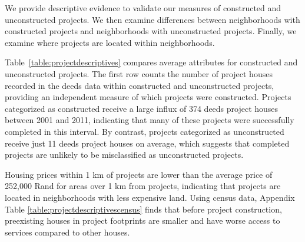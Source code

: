 \documentclass[12pt]{article}
\begin{document}






We provide descriptive evidence to validate our measures of constructed and unconstructed projects.  We then examine differences between neighborhoods with constructed projects and neighborhoods with unconstructed projects.  Finally, we examine where projects are located within neighborhoods.  

Table~\ref{table:projectdescriptives} compares average attributes for constructed and unconstructed projects.  The first row counts the number of project houses recorded in the deeds data within constructed and unconstructed projects, providing an independent measure of which projects were constructed.  Projects categorized as constructed receive a large influx of 374 deeds project houses between 2001 and 2011, indicating that many of these projects were successfully completed in this interval.  By contrast, projects categorized as unconstructed receive just 11 deeds project houses on average, which suggests that completed projects are unlikely to be misclassified as unconstructed projects.   

Housing prices within 1 km of projects are lower than the average price of 252,000 Rand for areas over 1 km from projects, indicating that projects are located in neighborhoods with less expensive land.  Using census data, Appendix Table \ref{table:projectdescriptivescensus} finds that before project construction, preexisting houses in project footprints are smaller and have worse access to services compared to other houses.  
\end{document}
